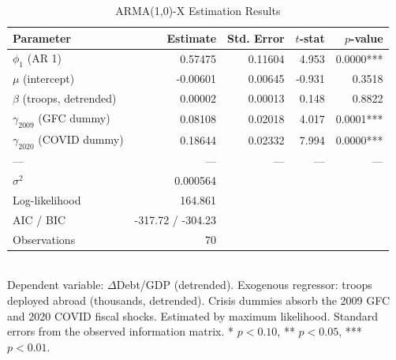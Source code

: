 \begin{table}[htbp]
  \centering
  \caption{ARMA(1,0)-X Estimation Results}
  \label{tab:armax_results}
  \begin{tabular}{lrrrr}
    \toprule
    Parameter & Estimate & Std. Error & $t$-stat & $p$-value \\
    \midrule
    $\phi_1$ (AR 1) & 0.57475 & 0.11604 & 4.953 & 0.0000*** \\
    $\mu$ (intercept) & -0.00601 & 0.00645 & -0.931 & 0.3518 \\
    $\beta$ (troops, detrended) & 0.00002 & 0.00013 & 0.148 & 0.8822 \\
    $\gamma_{2009}$ (GFC dummy) & 0.08108 & 0.02018 & 4.017 & 0.0001*** \\
    $\gamma_{2020}$ (COVID dummy) & 0.18644 & 0.02332 & 7.994 & 0.0000*** \\
    \midrule
    --- & --- & --- & --- & --- \\
    $\sigma^2$ & 0.000564 &  &  &  \\
    Log-likelihood & 164.861 &  &  &  \\
    AIC / BIC & -317.72 / -304.23 &  &  &  \\
    Observations & 70 &  &  &  \\
    \bottomrule
  \end{tabular}
  \\[2pt] \footnotesize{Dependent variable: $\Delta$Debt/GDP (detrended). Exogenous regressor: troops deployed abroad (thousands, detrended). Crisis dummies absorb the 2009 GFC and 2020 COVID fiscal shocks. Estimated by maximum likelihood. Standard errors from the observed information matrix. * $p<0.10$, ** $p<0.05$, *** $p<0.01$.}
\end{table}
